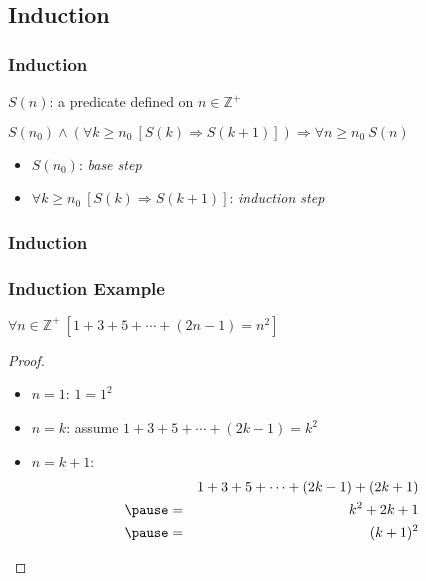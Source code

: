 \documentclass[dvipsnames]{beamer}
\begin{document}
\subsection{Induction}

\begin{frame}
  \frametitle{Induction}

  \begin{definition}
    $S(n)$: a predicate defined on $n \in \mathbb{Z}^+$

    \pause
    \medskip
    $S(n_0) \wedge (\forall k \geq n_0~[S(k) \Rightarrow S(k+1)])
      \Rightarrow \forall n \geq n_0~S(n)$
  \end{definition}

  \pause
  \medskip
  \begin{itemize}
    \item $S(n_0)$: \emph{base step}
    \item $\forall k \geq n_0~[S(k) \Rightarrow S(k+1)]$: \emph{induction step}
  \end{itemize}
\end{frame}

\begin{frame}
  \frametitle{Induction}

  \begin{center}
  \end{center}
\end{frame}

\begin{frame}
  \frametitle{Induction Example}

  \begin{theorem}
    $\forall n \in \mathbb{Z}^+~[1+3+5+\cdots+(2n-1)=n^2]$
  \end{theorem}

  \pause
  \begin{proof}
    \begin{itemize}
      \item $n=1$: $1=1^2$

      \pause
      \item $n=k$: assume $1+3+5+\cdots+(2k-1)=k^2$

      \pause
      \item $n=k+1$:
      \begin{eqnarray*}
        &   & 1+3+5+\cdots+(2k-1)+(2k+1)\\\pause
        & = & k^2+2k+1\\\pause
        & = & (k+1)^2
      \end{eqnarray*}
    \end{itemize}
  \end{proof}
\end{frame}
\end{document}
